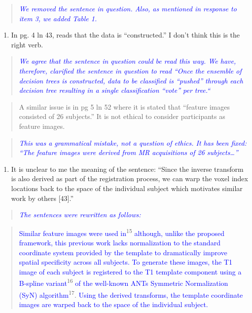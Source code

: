 \documentclass[12pt,]{article}
\providecommand{\tightlist}{%
  \setlength{\itemsep}{0pt}\setlength{\parskip}{0pt}}
\begin{document}
\begin{quote}
\emph{\textcolor{blue}{We removed the sentence in question.  Also, as mentioned in
response to item 3, we added Table 1.}}
\end{quote}

\begin{enumerate}
\def\labelenumi{\arabic{enumi}.}
\setcounter{enumi}{9}
\tightlist
\item
  In pg. 4 ln 43, reads that the data is ``constructed.'' I don't think
  this is the right verb.
\end{enumerate}

\begin{quote}
\emph{\textcolor{blue}{We agree that the sentence in question could be read this way.
We have, therefore, clarified the sentence in question to read
``Once the ensemble of decision trees is constructed, data to be classified is ``pushed''
through each decision tree resulting in a single classification ``vote'' per tree.``}}
\end{quote}

\begin{quote}
A similar issue is in pg 5 ln 52 where it is stated that ``feature
images consisted of 26 subjects.'' It is not ethical to consider
participants as feature images.
\end{quote}

\begin{quote}
\emph{\textcolor{blue}{This was a grammatical mistake, not a question of
ethics.  It has been fixed: ``The feature images
were derived from MR acquisitions of 26 subjects\ldots''}}
\end{quote}

\begin{enumerate}
\def\labelenumi{\arabic{enumi}.}
\setcounter{enumi}{10}
\tightlist
\item
  It is unclear to me the meaning of the sentence: ``Since the inverse
  transform is also derived as part of the registration process, we can
  warp the voxel index locations back to the space of the individual
  subject which motivates similar work by others {[}43{]}.''
\end{enumerate}

\begin{quote}
\emph{\textcolor{blue}{The sentences were rewritten as follows:}}
\end{quote}

\begin{quote}
\textcolor{blue}{Similar feature images were used in}\textsuperscript{15}
\textcolor{blue}{although, unlike the proposed framework, this previous work lacks
normalization to the standard
coordinate system provided by the template to dramatically improve spatial specificity
across all subjects.  To generate these images, the T1 image of each subject is
registered to the T1 template component using a B-spline variant}\textsuperscript{16}
\textcolor{blue}{of the well-known ANTs Symmetric Normalization (SyN) algorithm}\textsuperscript{17}.
\textcolor{blue}{Using the derived transforms, the template coordinate images are warped back to the space of the individual subject.}
\end{quote}
\end{document}
